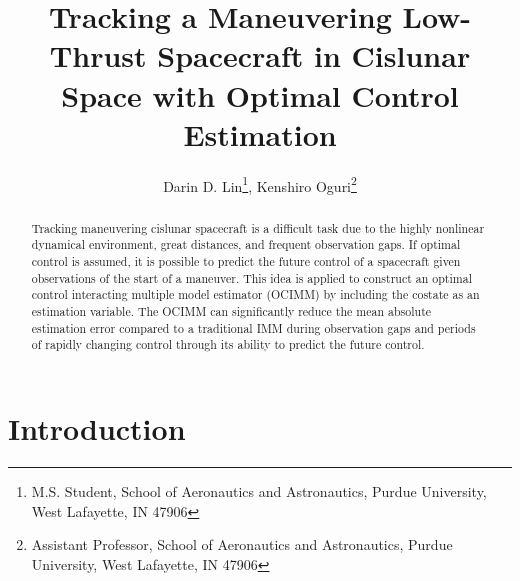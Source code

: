 \documentclass[letterpaper, preprint, paper,11pt]{AAS}	%
\begin{document}
\title{Tracking a Maneuvering Low-Thrust Spacecraft in Cislunar Space with Optimal Control Estimation}

\author{Darin D. Lin\thanks{M.S. Student, School of Aeronautics and Astronautics, Purdue University, West Lafayette, IN 47906},  
Kenshiro Oguri\thanks{Assistant Professor, School of Aeronautics and Astronautics, Purdue University, West Lafayette, IN 47906}}


\maketitle{} 		


\begin{abstract}
Tracking maneuvering cislunar spacecraft is a difficult task due to the highly nonlinear dynamical environment, great distances, and frequent observation gaps. If optimal control is assumed, it is possible to predict the future control of a spacecraft given observations of the start of a maneuver. This 
idea is applied to construct an optimal control interacting multiple model estimator (OCIMM) by including the costate as an estimation variable. The OCIMM can significantly reduce the mean absolute estimation error compared to a traditional IMM during observation gaps and periods of rapidly changing control through its ability to predict the future control. 
\end{abstract}


\section{Introduction}

\end{document}
